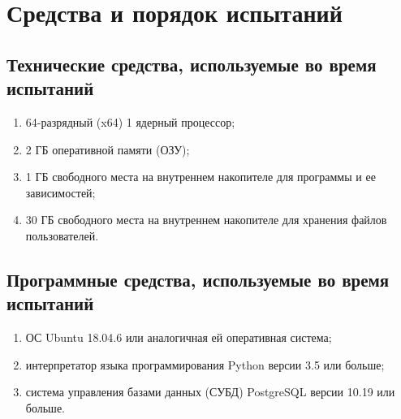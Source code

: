 \documentclass[a4paper,12pt]{article}
\begin{document}
  \newpage
  \section{Средства и порядок испытаний}
  \subsection{Технические средства, используемые во время испытаний}
  \begin{enumerate}
    \item 64-разрядный (x64) 1 ядерный процессор;
    \item 2 ГБ оперативной памяти (ОЗУ);
    \item 1 ГБ свободного места на внутреннем накопителе для программы и ее зависимостей;
    \item 30 ГБ свободного места на внутреннем накопителе для хранения файлов пользователей.
  \end{enumerate}
  \subsection{Программные средства, используемые во время испытаний}
  \begin{enumerate}
    \item ОС Ubuntu 18.04.6 или аналогичная ей оперативная система;
    \item интерпретатор языка программирования Python версии 3.5 или больше;
    \item система управления базами данных (СУБД) PostgreSQL версии 10.19 или больше.
  \end{enumerate}
\end{document}
